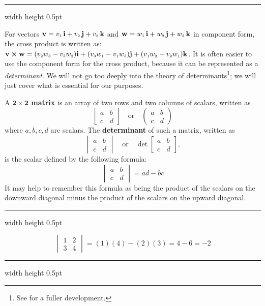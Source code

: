 \hrule width \textwidth height 0.5pt
\vspace{4mm}

For vectors $\textbf{v} = v_{\scriptscriptstyle 1}\,\textbf{i} + v_{\scriptscriptstyle 2}\,\textbf{j} + v_{\scriptscriptstyle 3}\,\textbf{k}$ and $\textbf{w} = w_{\scriptscriptstyle 1}\,\textbf{i} + w_{\scriptscriptstyle 2}\,\textbf{j} + w_{\scriptscriptstyle 3}\,\textbf{k}$ in component form, the cross
product is written as: $\textbf{v} \bm{\times} \textbf{w} = (v_{\scriptscriptstyle 2}w_{\scriptscriptstyle 3} -
v_{\scriptscriptstyle 3}w_{\scriptscriptstyle 2})\textbf{i} + (v_{\scriptscriptstyle 3}w_{\scriptscriptstyle 1} - v_{\scriptscriptstyle 1}w_{\scriptscriptstyle 3})\textbf{j} +
(v_{\scriptscriptstyle 1}w_{\scriptscriptstyle 2} - v_{\scriptscriptstyle 2}w_{\scriptscriptstyle 1})\textbf{k}$.
It is often easier to use the component form for the cross product, because it can be represented as a
\emph{determinant}. We will not go too deeply into the theory of determinants\footnote{See \cite{ar}
for a fuller development.}; we will just cover what is essential for our purposes.

A \textbf{$\bm{2 \times 2}$ matrix} is an array of two rows and two columns of scalars, written as
\begin{displaymath}
 \begin{bmatrix}
  a & b\\
  c & d
 \end{bmatrix}
 \quad\text{or}\quad
 \begin{pmatrix}
  a & b\\
  c & d
 \end{pmatrix}
\end{displaymath}
where $a, b, c, d$ are scalars. The \textbf{determinant} of such a matrix, written as
\begin{displaymath}
 \begin{vmatrix}
  a & b\\
  c & d
 \end{vmatrix}
 \quad\text{or}\quad
 \det \begin{bmatrix}
  a & b\\
  c & d
 \end{bmatrix},
\end{displaymath}
is the scalar defined by the following formula:
\begin{displaymath}
 \begin{vmatrix}
  a & b\\
  c & d
 \end{vmatrix}
 = ad - bc
\end{displaymath}
It may help to remember this formula as being the product of the scalars on the downward diagonal minus the product of
the scalars on the upward diagonal.

\vspace{3mm}
\hrule width \textwidth height 0.5pt
\begin{exmp}
 \begin{displaymath}
  \begin{vmatrix}
   1 & 2\\
   3 & 4
  \end{vmatrix}
  = (1)(4) - (2)(3) = 4 - 6 = -2
 \end{displaymath}
\end{exmp}
\hrule width \textwidth height 0.5pt
\vspace{3mm}

